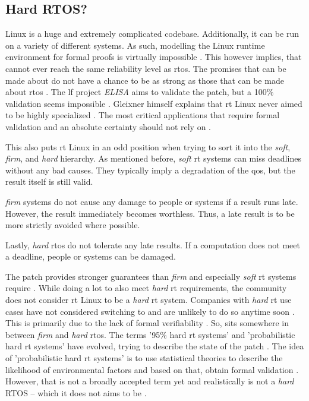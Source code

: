 \documentclass[10pt,twocolumn,a4paper]{article}
\begin{document}
\subsection{Hard RTOS?}
Linux is a huge and extremely complicated codebase.
Additionally, it can be run on a variety of different systems.
As such, modelling the Linux runtime environment for formal proofs is virtually impossible \cite{reghenzani_realtime_2019}.
This however implies, that  cannot ever reach the same reliability level as \acrshort{rtos}.
The promises that can be made about  do not have a chance to be as strong as those that can be made about \acrshort{rtos} \cite{reghenzani_realtime_2019}.
The \acrfull{lf} project \emph{ELISA} \cite{elisa_2025} aims to validate the patch, but a 100\% validation seems impossible \cite{perlow_trenches_2021}.
Gleixner himself explains that \acrshort{rt} Linux never aimed to be highly specialized \cite{perlow_trenches_2021}.
The most critical applications that require formal validation and an absolute certainty should not rely on .

This also puts \acrshort{rt} Linux in an odd position when trying to sort it into the \emph{soft}, \emph{firm}, and \emph{hard} hierarchy.
As mentioned before, \emph{soft} \acrshort{rt} systems can miss deadlines without any bad causes.
They typically imply a degradation of the \acrshort{qos}, but the result itself is still valid.

\emph{firm} systems do not cause any damage to people or systems if a result runs late.
However, the result immediately becomes worthless.
Thus, a late result is to be more strictly avoided where possible.

Lastly, \emph{hard} \acrshort{rtos} do not tolerate any late results.
If a computation does not meet a deadline, people or systems can be damaged.

The  patch provides stronger guarantees than \emph{firm} and especially \emph{soft} \acrshort{rt} systems require \cite{reghenzani_realtime_2019}.
While doing a lot to also meet \emph{hard} \acrshort{rt} requirements, the community does not consider \acrshort{rt} Linux to be a \emph{hard} \acrshort{rt} system.
Companies with \emph{hard} \acrshort{rt} use cases have not considered switching to  and are unlikely to do so anytime soon \cite{reghenzani_realtime_2019}.
This is primarily due to the lack of formal verifiability \cite{reghenzani_realtime_2019}.
So,  sits somewhere in between \emph{firm} and \emph{hard} \acrshort{rtos}.
The terms '95\% hard \acrshort{rt} systems' and 'probabilistic hard \acrshort{rt} systems' have evolved, trying to describe the state of the patch \cite{reghenzani_realtime_2019}.
The idea of 'probabilistic hard \acrshort{rt} systems' is to use statistical theories to describe the likelihood of environmental factors and based on that, obtain formal validation \cite{reghenzani_realtime_2019}.
However, that is not a broadly accepted term yet and realistically  is not a \emph{hard} RTOS \cite{reghenzani_realtime_2019} -- which it does not aims to be \cite{perlow_trenches_2021}.
\end{document}
